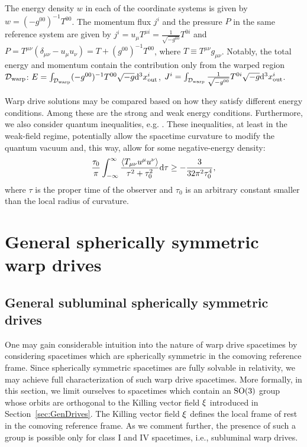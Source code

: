 \documentclass[10pt]{iopart}
\begin{document}
The energy density $w$ in each of the coordinate systems is given by $w=(-g^{00})^{-1}T^{00}$. The momentum flux $j^i$ and the pressure $P$ in the same reference system are given by $j^i=u_{\mu} T^{\mu i}=\frac{1}{\sqrt{-g^{00}}} T^{0i}$ and $P=T^{\mu\nu}(\delta_{\mu\nu}-u_{\mu}u_{\nu})= T + (g^{00})^{-1}T^{00}$, where $T\equiv T^{\mu\nu}g_{\mu\nu}$. Notably, the total energy and momentum contain the contribution only from the warped region $\mathcal{D}_{\rm warp}$: $E=\int_{\mathcal{D}_{\rm warp}}(-g^{00})^{-1}T^{00}\sqrt{-g}{\rm d}^3 x^i_{\rm out}$, $J^i=\int_{\mathcal{D}_{\rm warp}}\frac{1}{\sqrt{-g^{00}}} T^{0i}\sqrt{-g}{\rm d}^3 x^i_{\rm out}$.

Warp drive solutions may be compared based on how they satisfy different energy conditions. Among these are the strong and weak energy conditions. Furthermore, we also consider quantum inequalities, e.g. \cite{Pfenning1997CQG}. These inequalities, at least in the weak-field regime, potentially allow the spacetime curvature to modify the quantum vacuum and, this way, allow for some negative-energy density:
\begin{equation}
\label{eq:EnCond}
    \frac{\tau_0}{\pi}\int_{-\infty}^{\infty}\frac{\langle T_{\mu\nu}u^\mu u^\nu\rangle}{\tau^2+\tau_0^2}{\rm d}\tau\ge -\frac{3}{32\pi^2\tau_0^4},
\end{equation}
where $\tau$ is the proper time of the observer and $\tau_0$ is an arbitrary constant smaller than the local radius of curvature.



\section{General spherically symmetric warp drives}
\label{sec:SphGen}

\subsection{General subluminal spherically symmetric drives}

One may gain considerable intuition into the nature of warp drive spacetimes by considering spacetimes which are spherically symmetric in the comoving reference frame. Since spherically symmetric spacetimes are fully solvable in relativity, we may achieve full characterization of such warp drive spacetimes. More formally, in this section, we limit ourselves to spacetimes which contain an ${\rm SO}(3)$ group whose orbits are orthogonal to the Killing vector field ${\bf \xi}$ introduced in Section~\ref{sec:GenDrives}. The Killing vector field ${\bf \xi}$ defines the local frame of rest in the comoving reference frame. As we comment further, the presence of such a group is possible only for class I and IV spacetimes, i.e., subluminal warp drives. 
\end{document}
